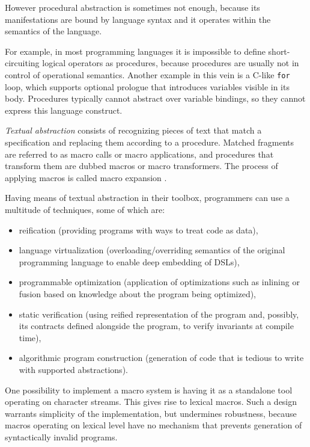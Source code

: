 \documentclass[10pt,journal,a4paper]{IEEEtran}
\begin{document}
However procedural abstraction is sometimes not enough, because
its manifestations are bound by language syntax and it operates within the semantics
of the language.

For example, in most programming languages it is impossible to define short-circuiting logical operators
as procedures, because procedures are usually not in control of operational semantics.
Another example in this vein is a C-like \texttt{for} loop, which supports
optional prologue that introduces variables visible in its body. Procedures typically cannot abstract
over variable bindings, so they cannot express this language construct.


\emph{Textual abstraction} consists of recognizing pieces of text
that match a specification and replacing them according
to a procedure.
Matched fragments are referred to as macro calls or macro applications, and
procedures that transform them are dubbed macros or macro transformers.
The process of applying macros is called macro expansion \cite{kohlbecker86}.

Having means of textual abstraction in their toolbox, programmers can use a multitude of techniques,
some of which are:
\begin{itemize}
\item reification (providing programs with ways to treat code as data),
\item language virtualization (overloading/overriding semantics of the original programming language
to enable deep embedding of DSLs),
\item programmable optimization (application of optimizations such as inlining
or fusion based on knowledge about the program being optimized),
\item static verification (using reified representation of the program
and, possibly, its contracts defined alongside the program, to verify invariants
at compile time),
\item algorithmic program construction (generation of code that is tedious to write with
supported abstractions).
\end{itemize}

One possibility to implement a macro system is having it as a standalone tool
operating on character streams. This gives rise to lexical macros.
Such a design warrants simplicity of the implementation,
but undermines robustness, because macros operating on lexical level
have no mechanism that prevents generation of syntactically invalid programs.
\end{document}
